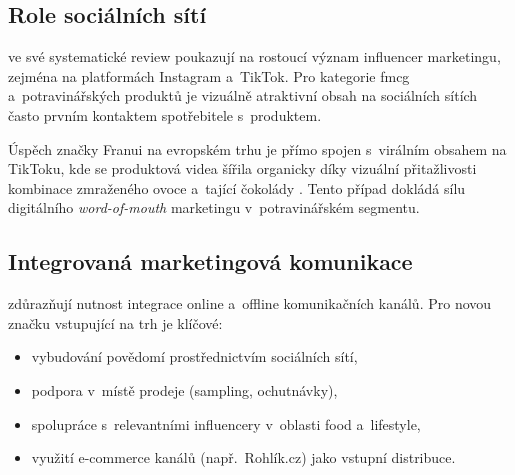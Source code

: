 \subsection{Role sociálních sítí}

\textcite{vrontis_2021} ve své systematické review poukazují na rostoucí význam influencer marketingu, zejména na platformách Instagram a~TikTok. Pro kategorie \gls{fmcg} a~potravinářských produktů je vizuálně atraktivní obsah na sociálních sítích často prvním kontaktem spotřebitele s~produktem.

Úspěch značky Franui na evropském trhu je přímo spojen s~virálním obsahem na TikToku, kde se produktová videa šířila organicky díky vizuální přitažlivosti kombinace zmraženého ovoce a~tající čokolády \parencite{franui_web}. Tento případ dokládá sílu digitálního \emph{word-of-mouth} marketingu v~potravinářském segmentu.

\subsection{Integrovaná marketingová komunikace}

\textcite{chaffey_ellis_2019} zdůrazňují nutnost integrace online a~offline komunikačních kanálů. Pro novou značku vstupující na trh je klíčové:
\begin{itemize}
  \item vybudování povědomí prostřednictvím sociálních sítí,
  \item podpora v~místě prodeje (sampling, ochutnávky),
  \item spolupráce s~relevantními influencery v~oblasti food a~lifestyle,
  \item využití e-commerce kanálů (např.\ Rohlík.cz) jako vstupní distribuce.
\end{itemize}

